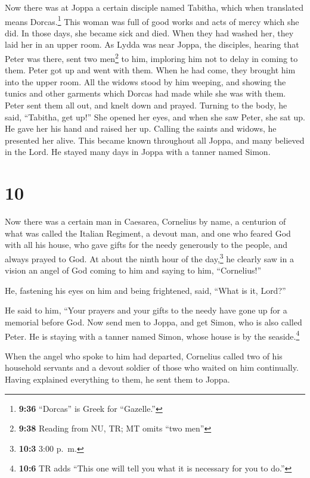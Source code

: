  Now there was at Joppa a certain disciple named Tabitha,
which when translated means Dorcas.\footnote{\textbf{9:36} ``Dorcas'' is
  Greek for ``Gazelle.''} This woman was full of good works and acts of
mercy which she did.  In those days, she became sick and
died. When they had washed her, they laid her in an upper room.
 As Lydda was near Joppa, the disciples, hearing that
Peter was there, sent two men\footnote{\textbf{9:38} Reading from NU,
  TR; MT omits ``two men''} to him, imploring him not to delay in coming
to them.  Peter got up and went with them. When he had
come, they brought him into the upper room. All the widows stood by him
weeping, and showing the tunics and other garments which Dorcas had made
while she was with them.  Peter sent them all out, and
knelt down and prayed. Turning to the body, he said, ``Tabitha, get
up!'' She opened her eyes, and when she saw Peter, she sat up.
 He gave her his hand and raised her up. Calling the
saints and widows, he presented her alive.  This became
known throughout all Joppa, and many believed in the Lord.
 He stayed many days in Joppa with a tanner named Simon.

\hypertarget{section-9}{%
\section{10}\label{section-9}}

 Now there was a certain man in Caesarea, Cornelius by
name, a centurion of what was called the Italian Regiment,
 a devout man, and one who feared God with all his house,
who gave gifts for the needy generously to the people, and always prayed
to God.  At about the ninth hour of the day,\footnote{\textbf{10:3}
  3:00 p.~m.} he clearly saw in a vision an angel of God coming to him
and saying to him, ``Cornelius!''

 He, fastening his eyes on him and being frightened, said,
``What is it, Lord?''

He said to him, ``Your prayers and your gifts to the needy have gone up
for a memorial before God.  Now send men to Joppa, and get
Simon, who is also called Peter.  He is staying with a
tanner named Simon, whose house is by the seaside.\footnote{\textbf{10:6}
  TR adds ``This one will tell you what it is necessary for you to do.''}

 When the angel who spoke to him had departed, Cornelius
called two of his household servants and a devout soldier of those who
waited on him continually.  Having explained everything to
them, he sent them to Joppa.

